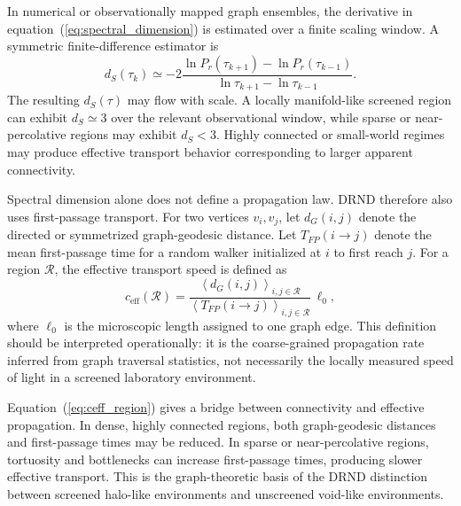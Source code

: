 \documentclass[12pt]{iopart}
\begin{document}
In numerical or observationally mapped graph ensembles, the derivative in equation~(\ref{eq:spectral_dimension}) is estimated over a finite scaling window. A symmetric finite-difference estimator is
\begin{equation}
d_S(\tau_k)
\simeq
-2
\frac{
\ln P_r(\tau_{k+1})-\ln P_r(\tau_{k-1})
}{
\ln \tau_{k+1}-\ln \tau_{k-1}
}.
\end{equation}
The resulting \(d_S(\tau)\) may flow with scale. A locally manifold-like screened region can exhibit \(d_S\simeq 3\) over the relevant observational window, while sparse or near-percolative regions may exhibit \(d_S<3\). Highly connected or small-world regimes may produce effective transport behavior corresponding to larger apparent connectivity.

Spectral dimension alone does not define a propagation law. DRND therefore also uses first-passage transport. For two vertices \(v_i,v_j\), let \(d_G(i,j)\) denote the directed or symmetrized graph-geodesic distance. Let \(T_{FP}(i\to j)\) denote the mean first-passage time for a random walker initialized at \(i\) to first reach \(j\). For a region \(\mathcal{R}\), the effective transport speed is defined as
\begin{equation}
c_{\mathrm{eff}}(\mathcal{R})
=
\frac{
\left\langle d_G(i,j)\right\rangle_{i,j\in\mathcal{R}}
}{
\left\langle T_{FP}(i\to j)\right\rangle_{i,j\in\mathcal{R}}
}
\,\ell_0,
\label{eq:ceff_region}
\end{equation}
where \(\ell_0\) is the microscopic length assigned to one graph edge. This definition should be interpreted operationally: it is the coarse-grained propagation rate inferred from graph traversal statistics, not necessarily the locally measured speed of light in a screened laboratory environment.

Equation~(\ref{eq:ceff_region}) gives a bridge between connectivity and effective propagation. In dense, highly connected regions, both graph-geodesic distances and first-passage times may be reduced. In sparse or near-percolative regions, tortuosity and bottlenecks can increase first-passage times, producing slower effective transport. This is the graph-theoretic basis of the DRND distinction between screened halo-like environments and unscreened void-like environments.
\end{document}
